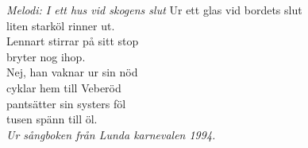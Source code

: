 {\footnotesize\textit{Melodi: I ett hus vid skogens slut}}
\vspace{10pt}
Ur ett glas vid bordets slut\\
liten starköl rinner ut.\\
Lennart stirrar på sitt stop\\
bryter nog ihop.\\
Nej, han vaknar ur sin nöd\\
cyklar hem till Veberöd\\
pantsätter sin systers föl\\
tusen spänn till öl.\\
\vspace{10pt}
{\footnotesize\textit{Ur sångboken från Lunda karnevalen 1994.}}
